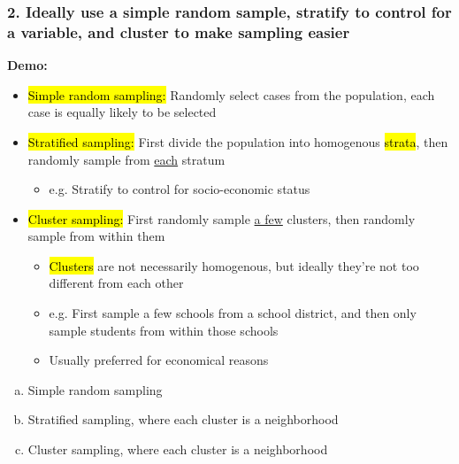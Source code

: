\documentclass[11pt,containsverbatim,handout,xcolor=xelatex,dvipsnames,table]{beamer}
\newcommand{\solnMult}[1]{#1}
\begin{document}
\begin{frame}
\frametitle{2. Ideally use a simple random sample, stratify to control for a variable, and cluster to make sampling easier}

\begin{center}
\textbf{Demo:} 
\end{center}

\begin{itemize}
\item \hl{Simple random sampling:} Randomly select cases from the population, each case is equally likely to be selected

\item \hl{Stratified sampling:} First divide the population into homogenous \hl{strata}, then randomly sample from \underline{each} stratum
\begin{itemize}
\item e.g. Stratify to control for socio-economic status
\end{itemize}

\item \hl{Cluster sampling:} First randomly sample \underline{a few} clusters, then randomly sample from within them
\begin{itemize}
\item \hl{Clusters} are not necessarily homogenous, but ideally they're not too different from each other
\item e.g. First sample a few schools from a school district, and then only sample students from within those schools
\item Usually preferred for economical reasons
\end{itemize}

\end{itemize}

\end{frame}


\begin{frame}


\begin{enumerate}[(a)]
\item Simple random sampling
\item Stratified sampling, where each cluster is a neighborhood
\item \solnMult{Cluster sampling, where each cluster is a neighborhood}
\end{enumerate}

\end{frame}
\end{document}
